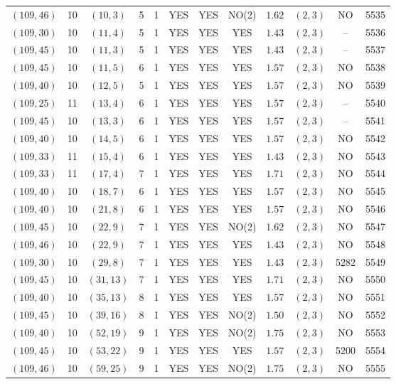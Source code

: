 \begin{longtable}{|c|c|c|c|c|c|c|c|c|c|c|c|}
$(109,46)$ & 10 & $(10,3)$ & 5 & 1 & YES & YES & NO(2) & $1.62$ & $(2,3)$ & NO & 5535\\
$(109,30)$ & 10 & $(11,4)$ & 5 & 1 & YES & YES & YES & $1.43$ & $(2,3)$ & -- & 5536\\
$(109,45)$ & 10 & $(11,3)$ & 5 & 1 & YES & YES & YES & $1.43$ & $(2,3)$ & -- & 5537\\
$(109,45)$ & 10 & $(11,5)$ & 6 & 1 & YES & YES & YES & $1.57$ & $(2,3)$ & NO & 5538\\
$(109,40)$ & 10 & $(12,5)$ & 5 & 1 & YES & YES & YES & $1.57$ & $(2,3)$ & NO & 5539\\
$(109,25)$ & 11 & $(13,4)$ & 6 & 1 & YES & YES & YES & $1.57$ & $(2,3)$ & -- & 5540\\
$(109,45)$ & 10 & $(13,3)$ & 6 & 1 & YES & YES & YES & $1.57$ & $(2,3)$ & -- & 5541\\
$(109,40)$ & 10 & $(14,5)$ & 6 & 1 & YES & YES & YES & $1.57$ & $(2,3)$ & NO & 5542\\
$(109,33)$ & 11 & $(15,4)$ & 6 & 1 & YES & YES & YES & $1.43$ & $(2,3)$ & NO & 5543\\
$(109,33)$ & 11 & $(17,4)$ & 7 & 1 & YES & YES & YES & $1.71$ & $(2,3)$ & NO & 5544\\
$(109,40)$ & 10 & $(18,7)$ & 6 & 1 & YES & YES & YES & $1.57$ & $(2,3)$ & NO & 5545\\
$(109,40)$ & 10 & $(21,8)$ & 6 & 1 & YES & YES & YES & $1.57$ & $(2,3)$ & NO & 5546\\
$(109,45)$ & 10 & $(22,9)$ & 7 & 1 & YES & YES & NO(2) & $1.62$ & $(2,3)$ & NO & 5547\\
$(109,46)$ & 10 & $(22,9)$ & 7 & 1 & YES & YES & YES & $1.43$ & $(2,3)$ & NO & 5548\\
$(109,30)$ & 10 & $(29,8)$ & 7 & 1 & YES & YES & YES & $1.43$ & $(2,3)$ & 5282 & 5549\\
$(109,45)$ & 10 & $(31,13)$ & 7 & 1 & YES & YES & YES & $1.71$ & $(2,3)$ & NO & 5550\\
$(109,40)$ & 10 & $(35,13)$ & 8 & 1 & YES & YES & YES & $1.57$ & $(2,3)$ & NO & 5551\\
$(109,45)$ & 10 & $(39,16)$ & 8 & 1 & YES & YES & NO(2) & $1.50$ & $(2,3)$ & NO & 5552\\
$(109,40)$ & 10 & $(52,19)$ & 9 & 1 & YES & YES & NO(2) & $1.75$ & $(2,3)$ & NO & 5553\\
$(109,45)$ & 10 & $(53,22)$ & 9 & 1 & YES & YES & YES & $1.57$ & $(2,3)$ & 5200 & 5554\\
$(109,46)$ & 10 & $(59,25)$ & 9 & 1 & YES & YES & NO(2) & $1.75$ & $(2,3)$ & NO & 5555\\

\end{longtable}
